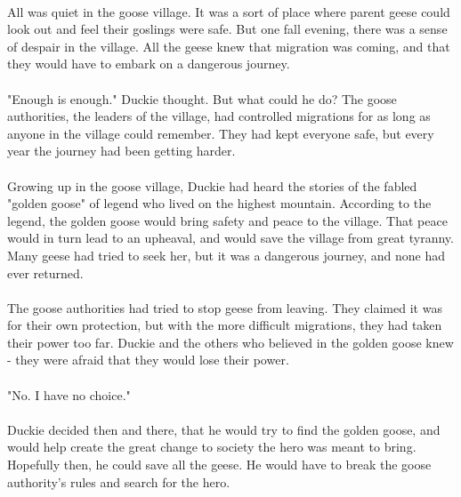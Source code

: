 \documentclass[a4paper,11pt,standalone]{book}
\begin{document}
\tableofcontents
\vfill
\pagebreak
\paragraph{} All was quiet in the goose village. It was a sort of place where parent geese could look out and feel their goslings were safe. But one fall evening, there was a sense of despair in the village. All the geese knew that migration was coming, and that they would have to embark on a dangerous journey. 
\paragraph{} "Enough is enough." Duckie thought. But what could he do? The goose authorities, the leaders of the village, had controlled migrations for as long as anyone in the village could remember. They had kept everyone safe, but every year the journey had been getting harder.
\paragraph{} Growing up in the goose village, Duckie had heard the stories of the fabled "golden goose" of legend who lived on the highest mountain. According to the legend, the golden goose would bring safety and peace to the village. That peace would in turn lead to an upheaval, and would save the village from great tyranny. Many geese had tried to seek her, but it was a dangerous journey, and none had ever returned. 
\paragraph{} The goose authorities had tried to stop geese from leaving. They claimed it was for their own protection, but with the more difficult migrations, they had taken their power too far. Duckie and the others who believed in the golden goose knew - they were afraid that they would lose their power.
\paragraph{} "No. I have no choice." 
\paragraph{} Duckie decided then and there, that he would try to find the golden goose, and would help create the great change to society the hero was meant to bring. Hopefully then, he could save all the geese. He would have to break the goose authority's rules and search for the hero.
\vfill
\pagebreak






\end{document}
